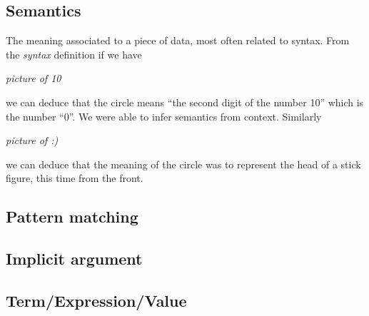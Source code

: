 \documentclass[
]{article}
\begin{document}
\hypertarget{semantics-1}{%
\subsection{Semantics}\label{semantics-1}}

The meaning associated to a piece of data, most often related to syntax.
From the \emph{syntax} definition if we have

\emph{picture of 10}

we can deduce that the circle means ``the second digit of the number
10'' which is the number ``0''. We were able to infer semantics from
context. Similarly

\emph{picture of :)}

we can deduce that the meaning of the circle was to represent the head
of a stick figure, this time from the front.

\hypertarget{pattern-matching-1}{%
\subsection{Pattern matching}\label{pattern-matching-1}}

\hypertarget{implicit-argument}{%
\subsection{Implicit argument}\label{implicit-argument}}

\hypertarget{termexpressionvalue}{%
\subsection{Term/Expression/Value}\label{termexpressionvalue}}

 

\end{document}
